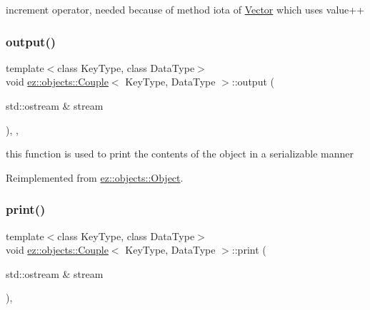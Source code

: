increment operator, needed because of method iota of \hyperlink{classez_1_1objects_1_1Vector}{Vector} which uses value++ \mbox{\label{classez_1_1objects_1_1Couple_a7d64b5194ac6092bc553d97fedbe23ad}} 
\subsubsection{\texorpdfstring{output()}{output()}}
{\footnotesize\ttfamily template$<$class Key\+Type, class Data\+Type$>$ \\
void \hyperlink{classez_1_1objects_1_1Couple}{ez\+::objects\+::\+Couple}$<$ Key\+Type, Data\+Type $>$\+::output (\begin{DoxyParamCaption}\item[{std\+::ostream \&}]{stream }\end{DoxyParamCaption})\hspace{0.3cm}{\ttfamily [inline]}, {\ttfamily [override]}, {\ttfamily [virtual]}}

this function is used to print the contents of the object in a serializable manner 

Reimplemented from \hyperlink{classez_1_1objects_1_1Object_a0fdfe18e6c35d6b0d7e7a01265aded15}{ez\+::objects\+::\+Object}.

\mbox{\label{classez_1_1objects_1_1Couple_ab419858cd3ca8fa27f637ece04d52a97}} 
\subsubsection{\texorpdfstring{print()}{print()}}
{\footnotesize\ttfamily template$<$class Key\+Type, class Data\+Type$>$ \\
void \hyperlink{classez_1_1objects_1_1Couple}{ez\+::objects\+::\+Couple}$<$ Key\+Type, Data\+Type $>$\+::print (\begin{DoxyParamCaption}\item[{std\+::ostream \&}]{stream }\end{DoxyParamCaption})\hspace{0.3cm}{\ttfamily [inline]}, {\ttfamily [virtual]}}


